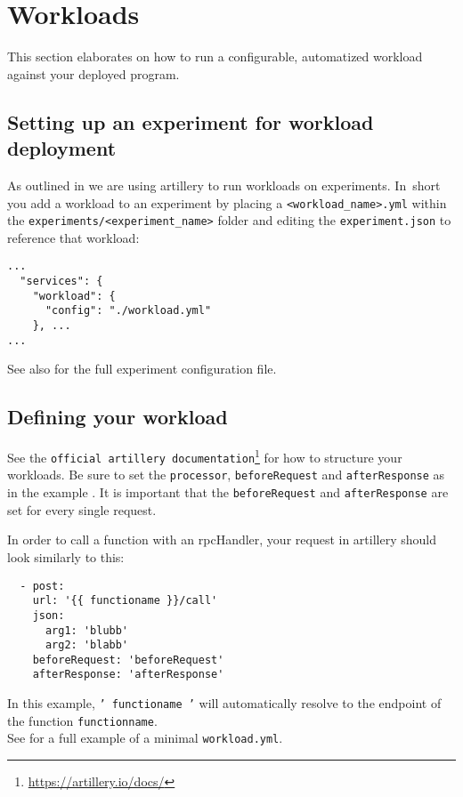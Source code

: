 \documentclass[../main.tex]{subfiles}
\begin{document}
\section{Workloads}\label{sec:WorkloadsUsage}

This section elaborates on how to run a configurable, automatized workload against your deployed program.

\subsection{Setting up an experiment for workload deployment}

As outlined in  we are using artillery to run workloads on experiments. 
In~short you add a workload to an experiment by placing a \texttt{<workload\_name>.yml} 
within the \texttt{experiments/<experiment\_name>} 
folder and editing the \texttt{experiment.json} to reference that workload:

\begin{tcolorbox}[titleDetachedStyle, title=\texttt{experiment.json}]
\begin{verbatim}
...
  "services": {
    "workload": {
      "config": "./workload.yml"
    }, ...
...
\end{verbatim}
\end{tcolorbox}\noindent
See also  for the full experiment configuration file.


\subsection{Defining your workload}

See the \texttt{official artillery documentation}\footnote{\url{https://artillery.io/docs/}} for how to structure your workloads. 
Be sure to set the \texttt{processor}, \texttt{beforeRequest} and \texttt{afterResponse} as in the example . 
It is important that the \texttt{beforeRequest} and \texttt{afterResponse} are set for every single request.

In order to call a function with an rpcHandler, your request in artillery should look similarly to this:
\begin{tcolorbox}[titleDetachedStyle, title=\texttt{workload.yml}]
\begin{verbatim}
  - post:
    url: '{{ functioname }}/call'
    json:
      arg1: 'blubb' 
      arg2: 'blabb'
    beforeRequest: 'beforeRequest'
    afterResponse: 'afterResponse'
\end{verbatim}
\end{tcolorbox}
In this example, \texttt{'{{ functioname }}'} will automatically resolve to the endpoint of the function \texttt{functionname}. \\
See  for a full example of a minimal \texttt{workload.yml}.
\end{document}

